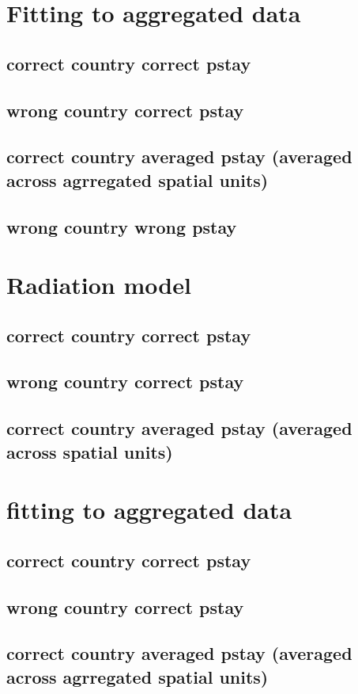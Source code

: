 \documentclass[a4paper,12pt]{article}
\begin{document}
\section{Fitting to aggregated data}
\subsection{correct country correct pstay}
\subsection{wrong country correct pstay}
\subsection{correct country averaged pstay (averaged across agrregated
  spatial units)}
\subsection{wrong country wrong pstay}
\section{Radiation model}
\subsection{correct country correct pstay}
\subsection{wrong country correct pstay}
\subsection{correct country averaged pstay (averaged across spatial
  units)}
\section{fitting to aggregated data}
\subsection{correct country correct pstay}
\subsection{wrong country correct pstay}
\subsection{correct country averaged pstay (averaged across agrregated
  spatial units)}
\end{document}
